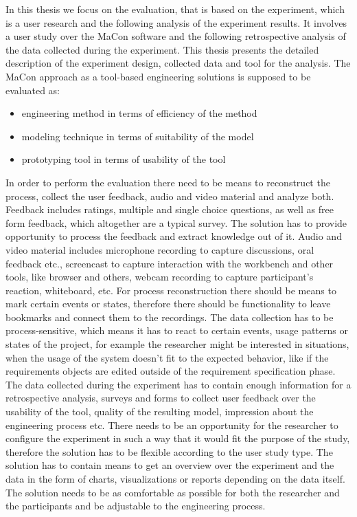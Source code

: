 In this thesis we focus on the evaluation, that is based on the experiment, which is a user research and the following analysis of the experiment results. It involves a user study over the MaCon software and the following retrospective analysis of the data collected during the experiment. This thesis presents the detailed description of the experiment design, collected data and tool for the analysis. The MaCon approach as a tool-based engineering solutions is supposed to be evaluated as:
\begin{itemize}
\item engineering method in terms of efficiency of the method
\item modeling technique in terms of suitability of the model
\item prototyping tool in terms of usability of the tool
\end{itemize}

In order to perform the evaluation there need to be means to reconstruct the process, collect the user feedback, audio and video material and analyze both. Feedback includes ratings, multiple and single choice questions, as well as free form feedback, which altogether are a typical survey. The solution has to provide opportunity to process the feedback and extract knowledge out of it. Audio and video material includes microphone recording to capture discussions, oral feedback etc., screencast to capture interaction with the workbench and other tools, like browser and others, webcam recording to capture participant's reaction, whiteboard, etc. For process reconstruction there should be means to mark certain events or states, therefore there should be functionality to leave bookmarks and connect them to the recordings. The data collection has to be process-sensitive, which means it has to react to certain events, usage patterns or states of the project, for example the researcher might be interested in situations, when the usage of the system doesn't fit to the expected behavior, like if the requirements objects are edited outside of the requirement specification phase. \\   

The data collected during the experiment has to contain enough information for a retrospective analysis, surveys and forms to collect user feedback over the usability of the tool, quality of the resulting model, impression about the engineering process etc. There needs to be an opportunity for the researcher to configure the experiment in such a way that it would fit the purpose of the study, therefore the solution has to be flexible according to the user study type. The solution has to contain means to get an overview over the experiment and the data in the form of charts, visualizations or reports depending on the data itself. The solution needs to be as comfortable as possible for both the researcher and the participants and be adjustable to the engineering process. 

